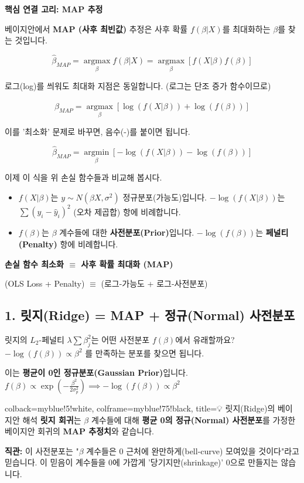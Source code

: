 \documentclass[11pt,a4paper]{book}
\theoremstyle{definition}
\begin{document}
\textbf{핵심 연결 고리: MAP 추정}

베이지안에서 \textbf{MAP (사후 최빈값)} 추정은 사후 확률 $f(\beta | X)$를 최대화하는 $\beta$를 찾는 것입니다.

$$ \hat{\beta}_{MAP} = \underset{\beta}{\operatorname{argmax}} f(\beta | X) = \underset{\beta}{\operatorname{argmax}} [ f(X | \beta) f(\beta) ] $$

로그(log)를 씌워도 최대화 지점은 동일합니다. (로그는 단조 증가 함수이므로)

$$ \hat{\beta}_{MAP} = \underset{\beta}{\operatorname{argmax}} [ \log(f(X | \beta)) + \log(f(\beta)) ] $$

이를 '최소화' 문제로 바꾸면, 음수(-)를 붙이면 됩니다.

$$ \hat{\beta}_{MAP} = \underset{\beta}{\operatorname{argmin}} [ - \log(f(X | \beta)) - \log(f(\beta)) ] $$

이제 이 식을 위 손실 함수들과 비교해 봅시다.

\begin{itemize}
    \item $f(X | \beta)$는 $y \sim N(\beta X, \sigma^2)$ 정규분포(가능도)입니다.
    $-\log(f(X | \beta))$는 $\sum (y_i - \hat{y}_i)^2$ (오차 제곱합) 항에 비례합니다.
    
    \item $f(\beta)$는 $\beta$ 계수들에 대한 \textbf{사전분포(Prior)}입니다.
    $-\log(f(\beta))$는 \textbf{페널티(Penalty)} 항에 비례합니다.
\end{itemize}

\begin{summarybox}
    \textbf{손실 함수 최소화 $\equiv$ 사후 확률 최대화 (MAP)}
    
    (OLS Loss + Penalty) $\equiv$ (로그-가능도 + 로그-사전분포)
\end{summarybox}

\subsection{1. 릿지(Ridge) = MAP + 정규(Normal) 사전분포}

릿지의 $L_2$-페널티 $\lambda \sum \beta_j^2$는 어떤 사전분포 $f(\beta)$에서 유래할까요?
$-\log(f(\beta)) \propto \beta^2$ 를 만족하는 분포를 찾으면 됩니다.

이는 \textbf{평균이 0인 정규분포(Gaussian Prior)}입니다.
$f(\beta) \propto \exp(-\frac{\beta^2}{2\sigma_p^2}) \implies -\log(f(\beta)) \propto \beta^2$

\begin{tcolorbox}{colback=myblue!5!white, colframe=myblue!75!black, title=💡 릿지(Ridge)의 베이지안 해석}
    \textbf{릿지 회귀}는 $\beta$ 계수들에 대해 \textbf{평균 0의 정규(Normal) 사전분포}를 가정한
    베이지안 회귀의 \textbf{MAP 추정치}와 같습니다.
    
    \textbf{직관:} 이 사전분포는 "$\beta$ 계수들은 0 근처에 완만하게(bell-curve) 모여있을 것이다"라고 믿습니다.
    이 믿음이 계수들을 0에 가깝게 '당기지만(shrinkage)' 0으로 만들지는 않습니다.
\end{tcolorbox}
\end{document}
